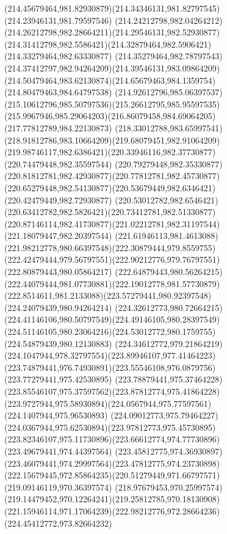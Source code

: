 {{	\curveto(214.45679464,981.82930879)(214.34346131,981.82797545)(214.23946131,981.79597546)
	\curveto(214.24212798,982.04264212)(214.26212798,982.28664211)(214.29546131,982.52930877)
	\curveto(214.31412798,982.5586421)(214.32879464,982.5906421)(214.33279464,982.63330877)
	\curveto(214.35279464,982.78797543)(214.37412797,982.94264209)(214.39546131,983.09864209)
	\curveto(214.50479464,983.62130874)(214.65679463,984.1359754)(214.80479463,984.64797538)
	\curveto(214.92612796,985.06397537)(215.10612796,985.50797536)(215.26612795,985.95597535)
	\curveto(215.9967946,985.29064203)(216.86079458,984.69064205)(217.77812789,984.22130873)
	\curveto(218.33012788,983.65997541)(218.91812786,983.10664209)(219.68079451,982.91064209)
	\curveto(219.98746117,982.6386421)(220.33946116,982.37730877)(220.74479448,982.35597544)
	\curveto(220.79279448,982.35330877)(220.81812781,982.42930877)(220.77812781,982.45730877)
	\curveto(220.65279448,982.54130877)(220.53679449,982.6346421)(220.42479449,982.72930877)
	\curveto(220.53012782,982.6546421)(220.63412782,982.5826421)(220.73412781,982.51330877)
	\curveto(220.87146114,982.41730877)(221.02212781,982.31197544)(221.18079447,982.20397544)
	\curveto(221.61946113,981.4613088)(221.98212778,980.66397548)(222.30879444,979.8559755)
	\curveto(222.42479444,979.56797551)(222.90212776,979.76797551)(222.80879443,980.05864217)
	\curveto(222.64879443,980.56264215)(222.44079444,981.07730881)(222.19012778,981.57730879)
	\curveto(222.8514611,981.2133088)(223.57279441,980.92397548)(224.24079439,980.94264214)
	\curveto(224.32612773,980.72664215)(224.41146106,980.50797549)(224.49146105,980.28397549)
	\curveto(224.51146105,980.23064216)(224.53012772,980.1759755)(224.54879439,980.12130883)
	\curveto(224.34612772,979.21864219)(224.1047944,978.32797554)(223.89946107,977.41464223)
	\curveto(223.74879441,976.74930891)(223.55546108,976.0879756)(223.77279441,975.42530895)
	\curveto(223.78879441,975.37464228)(223.85546107,975.37597562)(223.87812774,975.41864228)
	\curveto(223.9727944,975.58930894)(224.0567944,975.77597561)(224.1407944,975.96530893)
	\curveto(224.09012773,975.79464227)(224.0367944,975.62530894)(223.97812773,975.45730895)
	\curveto(223.82346107,975.11730896)(223.66612774,974.77730896)(223.49679441,974.44397564)
	\curveto(223.45812775,974.36930897)(223.46079441,974.29997564)(223.47812775,974.23730898)
	\curveto(222.15679445,972.85864235)(220.51279449,971.66797571)(219.09146119,970.36397574)
	\curveto(218.97679453,970.25997574)(219.14479452,970.12264241)(219.25812785,970.18130908)
	\curveto(221.15946114,971.17064239)(222.98212776,972.28664236)(224.45412772,973.82664232)
}}
